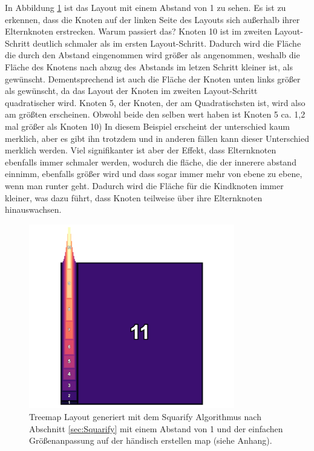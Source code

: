 In Abbildung \ref{fig:simpleIncreaseMarginOne} ist das Layout mit einem Abstand von 1 zu sehen. Es ist zu erkennen, dass die Knoten auf der linken Seite des Layouts sich außerhalb ihrer Elternknoten erstrecken. Warum passiert das? Knoten 10 ist im zweiten Layout-Schritt deutlich schmaler als im ersten Layout-Schritt. Dadurch wird die Fläche die durch den Abstand eingenommen wird größer als angenommen, weshalb die Fläche des Knotens nach abzug des Abstands im letzen Schritt kleiner ist, als gewünscht. Dementsprechend ist auch die Fläche der Knoten unten links größer als gewünscht, da das Layout der Knoten im zweiten Layout-Schritt quadratischer wird. Knoten 5, der Knoten, der am Quadratischsten ist, wird also am größten erscheinen. Obwohl beide den selben wert haben ist Knoten 5 ca. 1,2 mal größer als Knoten 10) In diesem Beispiel erscheint der unterschied kaum merklich, aber es gibt ihn trotzdem und in anderen fällen kann dieser Unterschied merklich werden.
Viel signifikanter ist aber der Effekt, dass Elternknoten ebenfalls immer schmaler werden, wodurch die fläche, die der innerere abstand einnimm, ebenfalls größer wird und dass sogar immer mehr von ebene zu ebene, wenn man runter geht. Dadurch wird die Fläche für die Kindknoten immer kleiner, was dazu führt, dass Knoten teilweise über ihre Elternknoten hinauswachsen.

\begin{figure}
    \centering
    \includegraphics[width=0.8\textwidth]{images/simpleIncreaseMarginOne.png}
    \caption{Treemap Layout generiert mit dem Squarify Algorithmus nach Abschnitt \ref{sec:Squarify} mit einem Abstand von 1 und der einfachen Größenanpassung auf der händisch erstellen map (siehe Anhang).}
    \label{fig:simpleIncreaseMarginOne}
\end{figure}

